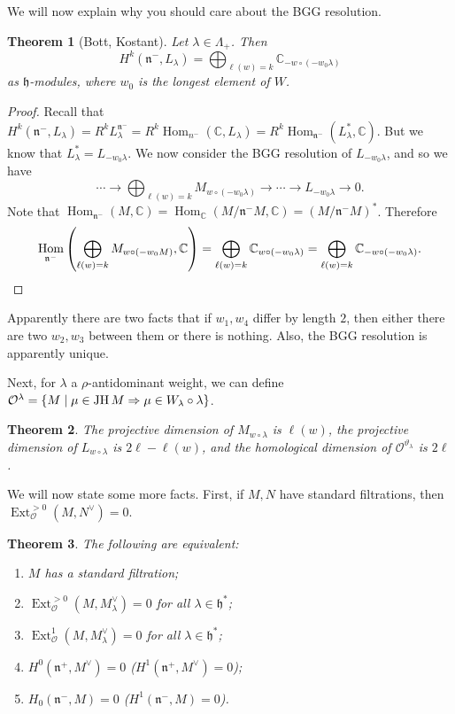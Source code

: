 \documentclass[leqno, openany]{memoir}
\newtheorem{thm}{Theorem}[section]
\theoremstyle{definition}
\theoremstyle{remark}
\theoremstyle{plain}
\theoremstyle{definition}
\theoremstyle{remark}
\newcommand{\C}{\mathbb{C}}
\newcommand{\cO}{\mathcal{O}}
\newcommand{\h}{\mathfrak{h}}
\newcommand{\n}{\mathfrak{n}}
\newcommand{\on}[1]{\operatorname{#1}}
\DeclareMathOperator{\Hom}{Hom}
\DeclareMathOperator{\Ext}{Ext}
\begin{document}
We will now explain why you should care about the BGG resolution.
\begin{thm}[Bott, Kostant]
    Let $\lambda \in \Lambda_+$. Then
    \[ H^k(\n^-, L_{\lambda}) = \bigoplus_{\ell(w) = k} \C_{- w \circ (-w_0 \lambda)} \]
    as $\h$-modules, where $w_0$ is the longest element of $W$.
\end{thm}

\begin{proof}
    Recall that $H^k(\n^-, L_{\lambda}) = R^k L_{\lambda}^{\n^-} = R^k \Hom_{n^-}(\C, L_{\lambda}) = R^k \Hom_{\n^-} (L_{\lambda}^*, \C)$. But we know that $L_{\lambda}^* = L_{- w_0 \lambda}$. We now consider the BGG resolution of $L_{- w_0 \lambda}$, and so we have
    \[ \cdots \to \bigoplus_{\ell(w) = k} M_{w \circ (-w_0 \lambda)} \to \cdots \to L_{-w_0 \lambda} \to 0. \]
    Note that $\Hom_{\n^-}(M, \C) = \Hom_{\C}(M/\n^- M, \C) = (M / \n^- M)^*$. Therefore
    \[ \Hom_{\n^-}\qty(\bigoplus_{\ell(w) = k} M_{w \circ (-w_0 M)}, \C) = \bigoplus_{\ell(w) = k} \C_{w \circ (-w_0 \lambda)} = \bigoplus_{\ell(w) = k} \C_{- w \circ (-w_0 \lambda)}. \]
\end{proof}

Apparently there are two facts that if $w_1, w_4$ differ by length $2$, then either there are two $w_2, w_3$ between them or there is nothing. Also, the BGG resolution is apparently unique.

Next, for $\lambda$ a $\rho$-antidominant weight, we can define $\cO^{\lambda} = \qty{M \mid \mu \in \on{JH} M \Rightarrow \mu \in W_{\lambda} \circ \lambda}$.

\begin{thm}
    The projective dimension of $M_{w \circ \lambda}$ is $\ell(w)$, the projective dimension of $L_{w \circ \lambda}$ is $2 \ell - \ell(w)$, and the homological dimension of $\cO^{\vartheta_{\lambda}}$ is $2 \ell$.
\end{thm}

We will now state some more facts. First, if $M, N$ have standard filtrations, then $\Ext_{\cO}^{>0}(M, N^{\vee}) = 0$.

\begin{thm}
    The following are equivalent:
    \begin{enumerate}
        \item $M$ has a standard filtration;
        \item $\Ext_{\cO}^{>0}(M, M_{\lambda}^{\vee}) = 0$ for all $\lambda \in \h^*$;
        \item $\Ext_{\cO}^1(M, M_{\lambda}^{\vee}) = 0$ for all $\lambda \in \h^*$;
        \item $H^0(\n^+, M^{\vee}) = 0$ ($H^1(\n^+, M^{\vee}) = 0$);
        \item $H_0(\n^-, M) = 0$ ($H^1(\n^-, M) = 0$).
    \end{enumerate}
\end{thm}
\end{document}
